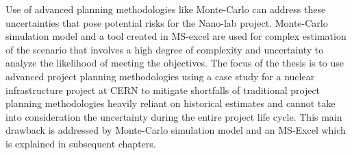 Use of advanced planning methodologies like Monte-Carlo can address these uncertainties that pose potential risks for the Nano-lab project. Monte-Carlo simulation model and a tool created in MS-excel are used for complex estimation of the scenario that involves a high degree of complexity and uncertainty to analyze the likelihood of meeting the objectives. The focus of the thesis is to use advanced project planning methodologies using a case study for a nuclear infrastructure project at CERN to mitigate shortfalls of traditional project planning methodologies heavily reliant on historical estimates and cannot take into consideration the uncertainty during the entire project life cycle. This main drawback is addressed by Monte-Carlo simulation model and an MS-Excel which is explained in subsequent chapters.








